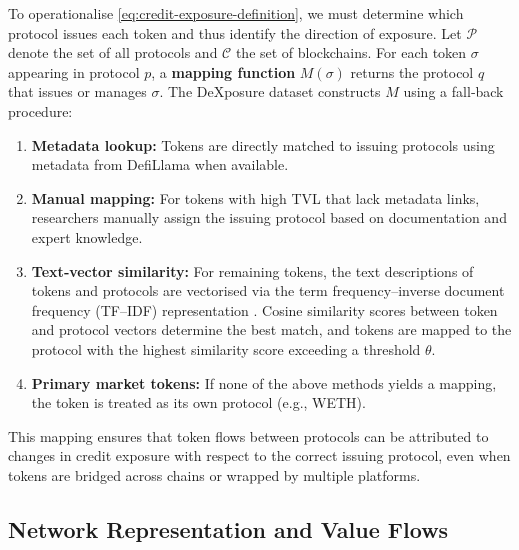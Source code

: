 \documentclass[preprint,12pt]{elsarticle}
\begin{document}
To operationalise \eqref{eq:credit-exposure-definition}, we must determine which protocol issues each token and thus identify the direction of exposure.  Let $\mathcal{P}$ denote the set of all protocols and $\mathcal{C}$ the set of blockchains.  For each token $\sigma$ appearing in protocol $p$, a \textbf{mapping function} $M(\sigma)$ returns the protocol $q$ that issues or manages $\sigma$.  The DeXposure dataset constructs $M$ using a fall‑back procedure:
\begin{enumerate}
  \item \textbf{Metadata lookup:} Tokens are directly matched to issuing protocols using metadata from DefiLlama when available.
  \item \textbf{Manual mapping:} For tokens with high TVL that lack metadata links, researchers manually assign the issuing protocol based on documentation and expert knowledge.
  \item \textbf{Text‑vector similarity:} For remaining tokens, the text descriptions of tokens and protocols are vectorised via the term frequency–inverse document frequency (TF--IDF) representation \cite{Qaiser2018}.  Cosine similarity scores between token and protocol vectors determine the best match, and tokens are mapped to the protocol with the highest similarity score exceeding a threshold $\theta$.
  \item \textbf{Primary market tokens:} If none of the above methods yields a mapping, the token is treated as its own protocol (e.g., WETH).
\end{enumerate}
This mapping ensures that token flows between protocols can be attributed to changes in credit exposure with respect to the correct issuing protocol, even when tokens are bridged across chains or wrapped by multiple platforms.

\subsection{Network Representation and Value Flows}
\end{document}
